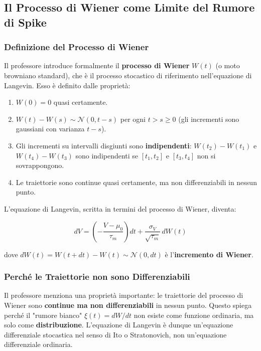 \subsection{Il Processo di Wiener come Limite del Rumore di Spike}

\subsubsection{Definizione del Processo di Wiener}

Il professore introduce formalmente il \textbf{processo di Wiener} $W(t)$ (o moto browniano standard), che è il processo stocastico di riferimento nell'equazione di Langevin. Esso è definito dalle proprietà:

\begin{enumerate}
    \item $W(0) = 0$ quasi certamente.
    \item $W(t) - W(s) \sim \mathcal{N}(0, t-s)$ per ogni $t > s \geq 0$ (gli incrementi sono gaussiani con varianza $t-s$).
    \item Gli incrementi su intervalli disgiunti sono \textbf{indipendenti}: $W(t_2) - W(t_1)$ e $W(t_4) - W(t_3)$ sono indipendenti se $[t_1, t_2]$ e $[t_3, t_4]$ non si sovrappongono.
    \item Le traiettorie sono continue quasi certamente, ma non differenziabili in nessun punto.
\end{enumerate}

L'equazione di Langevin, scritta in termini del processo di Wiener, diventa:

\begin{equation}
dV = \left(-\frac{V - \mu_0}{\tau_m}\right) dt + \frac{\sigma_V}{\sqrt{\tau_m}}\, dW(t)
\end{equation}

dove $dW(t) = W(t + dt) - W(t) \sim \mathcal{N}(0, dt)$ è l'\textbf{incremento di Wiener}.

\subsubsection{Perché le Traiettorie non sono Differenziabili}

Il professore menziona una proprietà importante: le traiettorie del processo di Wiener sono \textbf{continue ma non differenziabili} in nessun punto. Questo spiega perché il "rumore bianco" $\xi(t) = dW/dt$ non esiste come funzione ordinaria, ma solo come \textbf{distribuzione}. L'equazione di Langevin è dunque un'equazione differenziale stocastica nel senso di Ito o Stratonovich, non un'equazione differenziale ordinaria.


